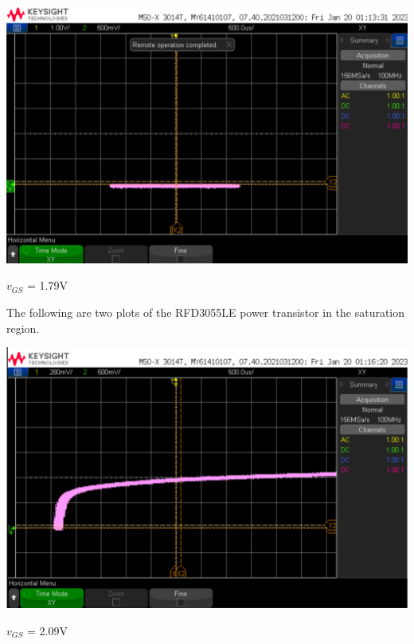 \documentclass[notitlepage, 12pt]{report}  %
\begin{document}
\begin{center}
    \includegraphics[scale=0.2]{cutoff.png}
\end{center}

\begin{center}
    $v_{GS}$ = 1.79V \\
\end{center}

The following are two plots of the RFD3055LE power transistor in the saturation region.\\

\begin{center}
    \includegraphics[scale=0.2]{sat1.png}
\end{center}

\begin{center}
$v_{GS}$ = 2.09V \\
\end{center}
\end{document}
